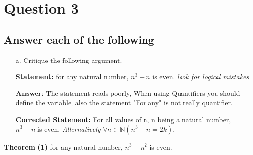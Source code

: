 \documentclass{article}
\begin{document}
\section*{Question 3}

\subsection*{\textbf{Answer each of the following \newline [8 marks]}}
\begin{itemize}
    \item[]
    \item[a.] Critique the following argument.
    \item[] 
    \item[] \textbf{Statement:} for any natural number, $n^3 - n$ is even. \textit{look for logical mistakes}
    \item[] 
    \item[] \textbf{Answer:} The statement reads poorly, When using Quantifiers you should define the variable, also the statement "For any" is not really quantifier.
    \item[] \textbf{Corrected Statement:} For all values of n, n being a natural number, $n^3 - n$ is even. \textit{Alternatively} $\forall n \in \mathbb{N} (n^3 - n = 2k)$.

\end{itemize}
\textbf{Theorem (1)} for any natural number, $n^3 - n^2$ is even.
\end{document}
